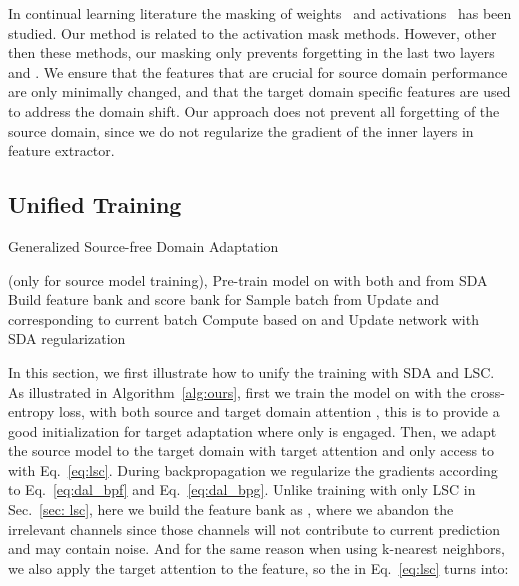 \documentclass[10pt,twocolumn,letterpaper]{article}
\begin{document}
In continual learning literature the masking of weights~\cite{mallya2018piggyback,mallya2018packnet} and activations~\cite{abati2020conditional,masana2021ternary,serra2018overcoming} has been studied. Our method is related to the activation mask methods. However, other then these methods, our masking only prevents forgetting in the last two layers  and .
We ensure that the features that are crucial for source domain performance are only minimally changed, and that the target domain specific features are used to address the domain shift. Our approach does not prevent all forgetting of the source domain, since we do not regularize the gradient of the inner layers in feature extractor.


\subsection{Unified Training}
\begin{algorithm}[tbp]
\small
	\caption{Generalized Source-free Domain Adaptation}
	\label{alg:ours}
	\begin{algorithmic}[1]
		\Require  (only for source model training),  \State Pre-train model on  with both  and  from SDA
		\State Build feature bank  and score bank  for 
		\State Sample batch  from  
		\State Update  and  corresponding to current batch 
		\State Compute  based on  and 
		\State Update network with SDA regularization
		\EndWhile 

	\end{algorithmic}
\end{algorithm}
\vspace{-2mm}

In this section, we first illustrate how to unify the training with SDA and LSC. As illustrated in Algorithm~\ref{alg:ours}, first we train the model on  with the cross-entropy loss, with both source and target domain attention , this is to provide a good initialization for target adaptation where only  is engaged. Then, we adapt the source model to the target domain with target attention  and only access to  with Eq.~\ref{eq:lsc}. During backpropagation we regularize the gradients according to Eq.~\ref{eq:dal_bpf} and Eq.~\ref{eq:dal_bpg}. Unlike training with only LSC in Sec.~\ref{sec: lsc}, here we build the feature bank as , where we abandon the irrelevant channels since those channels will not contribute to current prediction and may contain noise. And for the same reason when using k-nearest neighbors, we also apply the target attention to the feature, so the  in Eq.~\ref{eq:lsc} turns into:
\end{document}
